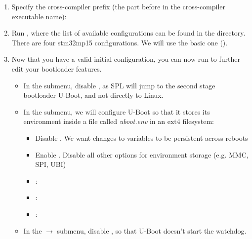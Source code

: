 \begin{enumerate}

\item Specify the cross-compiler prefix
(the part before  in the cross-compiler executable name):

\item Run , where the list of available
  configurations can be found in the  directory. There
  are four stm32mp15 configurations. We will use the basic one
  ().

\item Now that you have a valid initial configuration, you can now
  run  to further edit your bootloader features.
  \begin{itemize}

  \item In the  submenu, disable , as
     SPL will jump to the second stage bootloader U-Boot, and not directly to Linux.

  \item In the  submenu, we will configure U-Boot so
    that it stores its environment inside a file called {\em
      uboot.env} in an ext4 filesystem:
    \begin{itemize}
    \item Disable . We want changes to variables to
        be persistent across reboots
    \item Enable . Disable all other
        options for environment storage (e.g. MMC, SPI, UBI)
    \item {}: 
    \item {}: 
    \item {}: 
    \end{itemize}

  \item In the  $\rightarrow$  submenu, disable , so that U-Boot doesn't start the
    watchdog.
  \end{itemize}


\end{enumerate}
